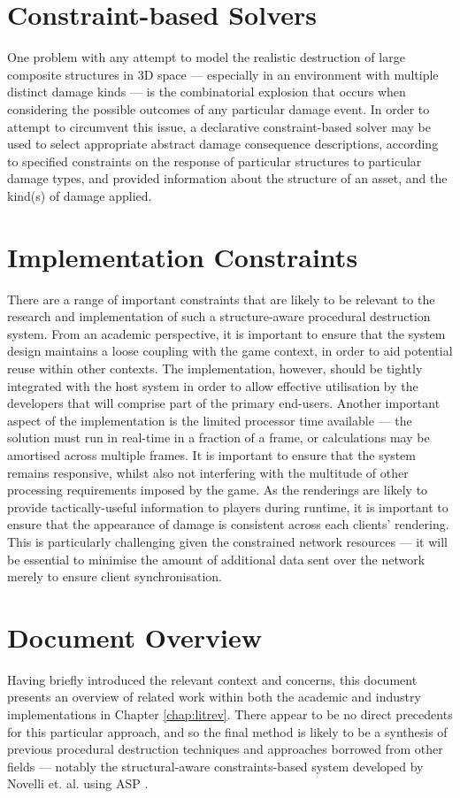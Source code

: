\documentclass[11pt]{report}
\begin{document}
	\section{Constraint-based Solvers}
		One problem with any attempt to model the realistic destruction of large composite structures in 3D space --- especially in an environment with multiple distinct damage kinds --- is the combinatorial explosion that occurs when considering the possible outcomes of any particular damage event. In order to attempt to circumvent this issue, a declarative constraint-based solver may be used to select appropriate abstract damage consequence descriptions, according to specified constraints on the response of particular structures to particular damage types, and provided information about the structure of an asset, and the kind(s) of damage applied.

	\section{Implementation Constraints}
		There are a range of important constraints that are likely to be relevant to the research and implementation of such a structure-aware procedural destruction system. From an academic perspective, it is important to ensure that the system design maintains a loose coupling with the game context, in order to aid potential reuse within other contexts. The implementation, however, should be tightly integrated with the host system in order to allow effective utilisation by the developers that will comprise part of the primary end-users. Another important aspect of the implementation is the limited processor time available --- the solution must run in real-time in a fraction of a frame, or calculations may be amortised across multiple frames. It is important to ensure that the system remains responsive, whilst also not interfering with the multitude of other processing requirements imposed by the game.
		As the renderings are likely to provide tactically-useful information to players during runtime, it is important to ensure that the appearance of damage is consistent across each clients' rendering. This is particularly challenging given the constrained network resources --- it will be essential to minimise the amount of additional data sent over the network merely to ensure client synchronisation.

	\section{Document Overview}
		Having briefly introduced the relevant context and concerns, this document presents an overview of related work within both the academic and industry implementations in Chapter \ref{chap:litrev}. There appear to be no direct precedents for this particular approach, and so the final method is likely to be a synthesis of previous procedural destruction techniques and approaches borrowed from other fields --- notably the structural-aware constraints-based system developed by Novelli et. al. using ASP \cite{novelli2012log}.
\end{document}
